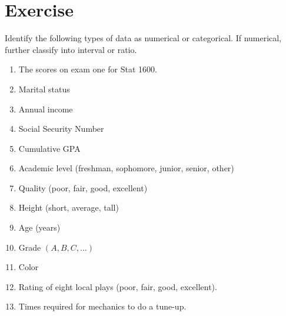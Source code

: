 \documentclass[11pt, chapterprefix=true]{scrbook}\usepackage[]{graphicx}\usepackage[]{color}
\begin{document}
\newpage

\section{Exercise}

\begin{exercises}    %

  \begin{exercise}  %

Identify the following types of data as numerical or categorical.  If numerical, further classify into interval or ratio.

	  \begin{enumerate}
	  \item The scores on exam one for Stat 1600.
    \item Marital status
    \item Annual income
    \item Social Security Number
    \item Cumulative GPA
    \item Academic level (freshman, sophomore, junior, senior, other)
    \item Quality (poor, fair, good, excellent)
    \item Height (short, average, tall)
    \item Age (years)
    \item Grade $(A, B, C, \dots)$
    \item Color
    \item Rating of eight local plays (poor, fair, good, excellent).
    \item Times required for mechanics to do a tune-up.
  	\end{enumerate}


  \end{exercise}
  \begin{solution}  %


\end{solution}
\end{exercises}
\end{document}
